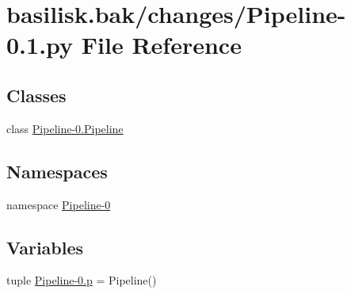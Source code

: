 \hypertarget{basilisk_8bak_2changes_2_pipeline-0_81_8py}{\section{basilisk.\-bak/changes/\-Pipeline-\/0.1.py \-File \-Reference}
\label{basilisk_8bak_2changes_2_pipeline-0_81_8py}
}
\subsection*{\-Classes}
\begin{DoxyCompactItemize}
\item 
class \hyperlink{class_pipeline-0_1_1_pipeline}{\-Pipeline-\/0.\-Pipeline}
\end{DoxyCompactItemize}
\subsection*{\-Namespaces}
\begin{DoxyCompactItemize}
\item 
namespace \hyperlink{namespace_pipeline-0}{\-Pipeline-\/0}
\end{DoxyCompactItemize}
\subsection*{\-Variables}
\begin{DoxyCompactItemize}
\item 
tuple \hyperlink{namespace_pipeline-0_a529a25d172d317ee7944da35198cd9c8}{\-Pipeline-\/0.\-p} = \-Pipeline()
\end{DoxyCompactItemize}
